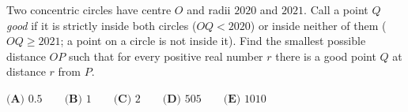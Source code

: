 Two concentric circles have centre $O$ and radii $2020$ and $2021$. Call a point $Q$ \emph{good} if it is strictly inside both circles ($OQ<2020$) or inside neither of them ($OQ\ge2021$; a point on a circle is not inside it). Find the smallest possible distance $OP$ such that for every positive real number $r$ there is a good point $Q$ at distance $r$ from $P$.

$\textbf{(A) }0.5\qquad\textbf{(B) }1\qquad\textbf{(C) }2\qquad\textbf{(D) }505\qquad\textbf{(E) }1010$
